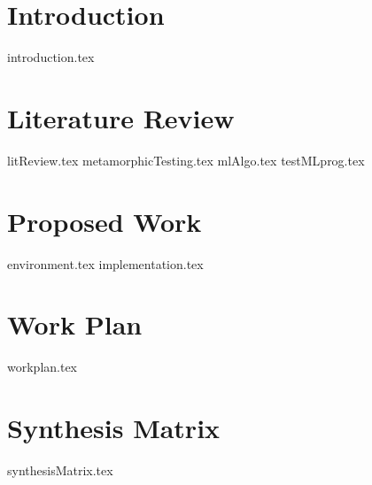 \documentclass[print,ms]{unothesis}
\begin{document}
	\chapter{Introduction}
	{introduction.tex}

	\chapter{Literature Review}
          {litReview.tex}
	{metamorphicTesting.tex}
	{mlAlgo.tex}
	{testMLprog.tex}

	\chapter{Proposed Work}
	{environment.tex}
	\newpage
	{implementation.tex}

	\chapter{Work Plan}
	{workplan.tex}
	\chapter{Synthesis Matrix}
	{synthesisMatrix.tex}

\backmatter

\appendix



	\nocite{*}
	
	
\end{document}
